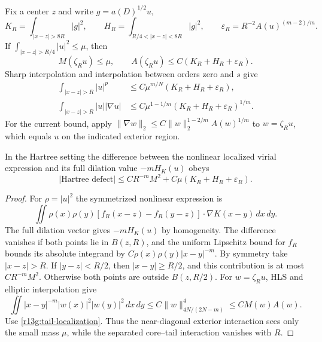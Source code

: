 Fix a center $z$ and write $g=a(D)^{1/2}u$,
\[
 K_R=\int_{|x-z|>8R}|g|^2,\qquad
 H_R=\int_{R/4<|x-z|<8R}|g|^2,\qquad
 \varepsilon_R=R^{-2}A(u)^{(m-2)/m}.
\]
If $\int_{|x-z|>R/4}|u|^2\le\mu$, then
\begin{equation}\label{r13g:tail-localization}
 M(\zeta_Ru)\le\mu,\qquad
 A(\zeta_Ru)\le C(K_R+H_R+\varepsilon_R).
\end{equation}
Sharp interpolation and interpolation between orders zero and $s$ give
\begin{align}
 \int_{|x-z|>R}|u|^p
 &\le C\mu^{m/N}(K_R+H_R+\varepsilon_R),
 \label{r13g:local-tail-struct}\\
 \int_{|x-z|>R}|u||\nabla u|
 &\le C\mu^{1-1/m}(K_R+H_R+\varepsilon_R)^{1/m}.
 \label{r13g:current-tail-struct}
\end{align}
For the current bound, apply
$\|\nabla w\|_2\le C\|w\|_2^{1-2/m}A(w)^{1/m}$ to
$w=\zeta_Ru$, which equals $u$ on the indicated exterior region.

\begin{lemma}
\label{lem:r13g-hartree-tail}
In the Hartree setting the difference between the nonlinear localized
virial expression and its full dilation value $-mH_K(u)$ obeys
\begin{equation}\label{r13g:hartree-tail}
 |\text{Hartree defect}|
 \le CR^{-m}M^2+C\mu(K_R+H_R+\varepsilon_R).
\end{equation}
\end{lemma}
\begin{proof}
For $\rho=|u|^2$ the symmetrized nonlinear expression is
\[
 \iint\rho(x)\rho(y)
 [f_R(x-z)-f_R(y-z)]\cdot\nabla K(x-y)\,dx\,dy.
\]
The full dilation vector gives $-mH_K(u)$ by homogeneity.
The difference vanishes if both points lie in $B(z,R)$, and the
uniform Lipschitz bound for $f_R$ bounds its absolute integrand by
$C\rho(x)\rho(y)|x-y|^{-m}$. By symmetry take $|x-z|>R$.
If $|y-z|<R/2$, then $|x-y|\ge R/2$, and this contribution is at
most $CR^{-m}M^2$. Otherwise both points are outside $B(z,R/2)$.
For $w=\zeta_Ru$, HLS and elliptic interpolation give
\[
 \iint|x-y|^{-m}|w(x)|^2|w(y)|^2\,dx\,dy
 \le C\|w\|_{4N/(2N-m)}^4\le CM(w)A(w).
\]
Use \eqref{r13g:tail-localization}. Thus the near-diagonal exterior
interaction sees only the small mass $\mu$, while the separated
core--tail interaction vanishes with $R$.
\end{proof}

